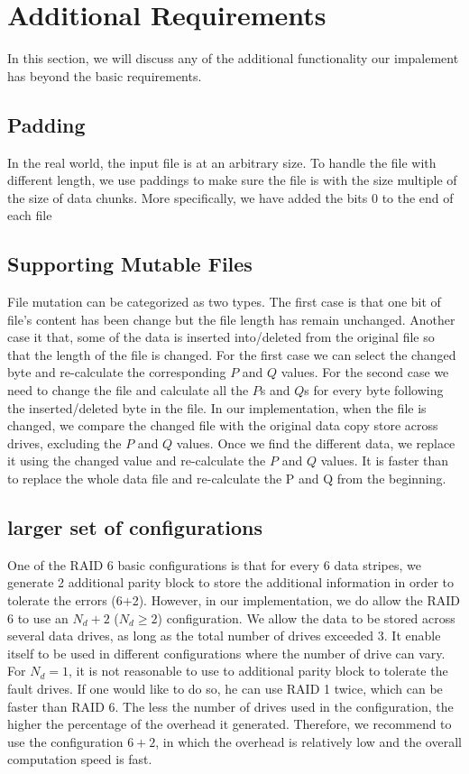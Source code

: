 \section{Additional Requirements}

In this section, we will discuss any of the additional functionality our impalement has beyond the basic requirements. 

\subsection{Padding}

In the real world, the input file is at an arbitrary size. To handle the file with different length, we use paddings to make sure the file is with the size multiple of the size of data chunks. More specifically, we have added the bits 0 to the end of each file 

\subsection{Supporting Mutable Files}

File mutation can be categorized as two types. The first case is that one bit of file’s content has been change but the file length has remain unchanged. Another case it that, some of the data is inserted into/deleted from the original file so that the length of the file is changed. For the first case we can select the changed byte and re-calculate the corresponding $P$ and $Q$ values. For the second case we need to change the file and calculate all the $P$s and $Q$s for every byte following the inserted/deleted byte in the file.
In our implementation, when the file is changed, we compare the changed file with the original data copy store across drives, excluding the $P$ and $Q$ values. Once we find the different data, we replace it using the changed value and re-calculate the $P$ and $Q$ values. It is faster than to replace the whole data file and re-calculate the P and Q from the beginning.

\subsection{larger set of configurations}

One of the RAID 6 basic configurations is that for every 6 data stripes, we generate 2 additional parity block to store the additional information in order to tolerate the errors (6+2). However, in our implementation, we do allow the RAID 6 to use an $N_d+2$ ($N_d \geq 2$) configuration. We allow the data to be stored across several data drives, as long as the total number of drives exceeded 3. It enable itself to be used in different configurations where the number of drive can vary. For $N_d = 1$, it is not reasonable to use to additional parity block to tolerate the fault drives. If one would like to do so, he can use RAID 1 twice, which can be faster than RAID 6. The less the number of drives used in the configuration, the higher the percentage of the overhead it generated. Therefore, we recommend to use the configuration $6 + 2$, in which the overhead is relatively low and the overall computation speed is fast.


